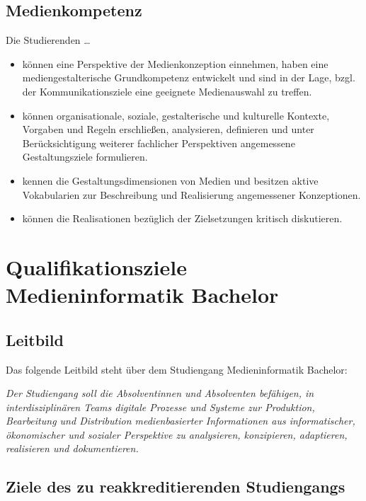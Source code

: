 \subsection{Medienkompetenz}\label{medienkompetenz}

Die Studierenden \ldots{}

\begin{itemize}
\tightlist
\item
  können eine Perspektive der Medienkonzeption einnehmen, haben eine
  mediengestalterische Grundkompetenz entwickelt und sind in der Lage,
  bzgl. der Kommunikationsziele eine geeignete Medienauswahl zu treffen.
\item
  können organisationale, soziale, gestalterische und kulturelle
  Kontexte, Vorgaben und Regeln erschließen, analysieren, definieren und
  unter Berücksichtigung weiterer fachlicher Perspektiven angemessene
  Gestaltungsziele formulieren.
\item
  kennen die Gestaltungsdimensionen von Medien und besitzen aktive
  Vokabularien zur Beschreibung und Realisierung angemessener
  Konzeptionen.
\item
  können die Realisationen bezüglich der Zielsetzungen kritisch
  diskutieren.
\end{itemize}

\section{Qualifikationsziele Medieninformatik
Bachelor}\label{qualifikationsziele-medieninformatik-bachelor}

\subsection{Leitbild}\label{leitbild}

Das folgende Leitbild steht über dem Studiengang Medieninformatik
Bachelor:

\emph{Der Studiengang soll die Absolventinnen und Absolventen befähigen,
in interdisziplinären Teams digitale Prozesse und Systeme zur
Produktion, Bearbeitung und Distribution medienbasierter Informationen
aus informatischer, ökonomischer und sozialer Perspektive zu
analysieren, konzipieren, adaptieren, realisieren und dokumentieren.}

\subsection{Ziele des zu reakkreditierenden
Studiengangs}\label{ziele-des-zu-reakkreditierenden-studiengangs}

